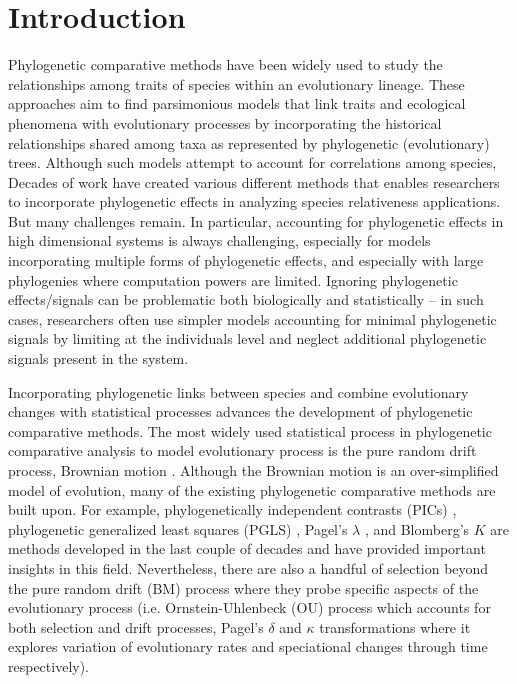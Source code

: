 \section{Introduction}

Phylogenetic comparative methods have been widely used to study the relationships among traits of species within an evolutionary lineage.
These approaches aim to find parsimonious models that link traits and ecological phenomena with evolutionary processes by incorporating the historical relationships shared among taxa as represented by phylogenetic (evolutionary) trees. 
Although such models attempt to account for correlations among species,  
Decades of work have created various different methods that enables researchers to incorporate phylogenetic effects in analyzing species relativeness applications.
But many challenges remain.
In particular, accounting for phylogenetic effects in high dimensional systems is always challenging, especially for models incorporating multiple forms of phylogenetic effects, and especially with large phylogenies where computation powers are limited.
Ignoring phylogenetic effects/signals can be problematic both biologically and statistically \citep{felsenstein1985phylogenies, li2017statistical} -- in such cases, researchers often use simpler models accounting for minimal phylogenetic signals by limiting at the individuals level and neglect additional phylogenetic signals present in the system.

Incorporating phylogenetic links between species and combine evolutionary changes with statistical processes advances the development of phylogenetic comparative methods.
The most widely used statistical process in phylogenetic comparative analysis to model evolutionary process is the pure random drift process, Brownian motion \citep{felsenstein1973maximum}. 
Although the Brownian motion is an over-simplified model of evolution, many of the existing phylogenetic comparative methods are built upon.
For example, phylogenetically independent contrasts (PICs) \citep{felsenstein1985phylogenies}, phylogenetic generalized least squares (PGLS) \citep{grafen1989phylogenetic}, Pagel's $\lambda$ \citep{pagel1999inferring}, and Blomberg's $K$ \citep{blomberg2003testing} are methods developed in the last couple of decades and have provided important insights in this field. 
Nevertheless, there are also a handful of selection beyond the pure random drift (BM) process where they probe specific aspects of the evolutionary process (i.e. Ornstein-Uhlenbeck (OU) process which accounts for both selection and drift processes, Pagel's $\delta$ and $\kappa$ transformations where it explores variation of evolutionary rates and speciational changes through time respectively).

